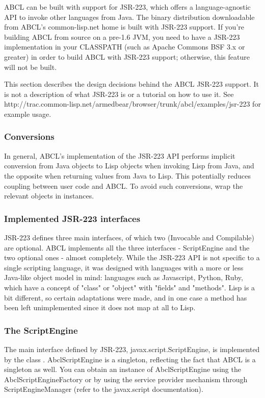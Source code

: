 \documentclass[10pt]{book}
\begin{document}
ABCL can be built with support for JSR-223, which offers a
language-agnostic API to invoke other languages from Java. The binary
distribution downloadable from ABCL's common-lisp.net home is built
with JSR-223 support. If you're building ABCL from source on a pre-1.6
JVM, you need to have a JSR-223 implementation in your CLASSPATH (such
as Apache Commons BSF 3.x or greater) in order to build ABCL with
JSR-223 support; otherwise, this feature will not be built.

This section describes the design decisions behind the ABCL JSR-223
support. It is not a description of what JSR-223 is or a tutorial on
how to use it. See
http://trac.common-lisp.net/armedbear/browser/trunk/abcl/examples/jsr-223
for example usage.

\subsubsection{Conversions}

In general, ABCL's implementation of the JSR-223 API performs implicit
conversion from Java objects to Lisp objects when invoking Lisp from
Java, and the opposite when returning values from Java to Lisp. This
potentially reduces coupling between user code and ABCL. To avoid such
conversions, wrap the relevant objects in  instances.

\subsubsection{Implemented JSR-223 interfaces}

JSR-223 defines three main interfaces, of which two (Invocable and
Compilable) are optional. ABCL implements all the three interfaces -
ScriptEngine and the two optional ones - almost completely. While the
JSR-223 API is not specific to a single scripting language, it was
designed with languages with a more or less Java-like object model in
mind: languages such as Javascript, Python, Ruby, which have a concept
of "class" or "object" with "fields" and "methods". Lisp is a bit
different, so certain adaptations were made, and in one case a method
has been left unimplemented since it does not map at all to Lisp.

\subsubsection{The ScriptEngine}

The main interface defined by JSR-223, javax.script.ScriptEngine, is
implemented by the class
. AbclScriptEngine
is a singleton, reflecting the fact that ABCL is a singleton as
well. You can obtain an instance of AbclScriptEngine using the
AbclScriptEngineFactory or by using the service provider mechanism
through ScriptEngineManager (refer to the javax.script documentation).
\end{document}
